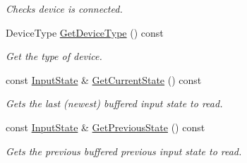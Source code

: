 \begin{DoxyCompactItemize}
\begin{DoxyCompactList}\small\item\em Checks device is connected. \end{DoxyCompactList}\item 
Device\+Type \hyperlink{class_blade_1_1_input_device_a4af210da6267e595e1239bab35f8e9e3}{Get\+Device\+Type} () const
\begin{DoxyCompactList}\small\item\em Get the type of device. \end{DoxyCompactList}\item 
const \hyperlink{struct_blade_1_1_input_state}{Input\+State} \& \hyperlink{class_blade_1_1_input_device_a71a14408ab206c4d983012b06b921d37}{Get\+Current\+State} () const
\begin{DoxyCompactList}\small\item\em Gets the last (newest) buffered input state to read. \end{DoxyCompactList}\item 
const \hyperlink{struct_blade_1_1_input_state}{Input\+State} \& \hyperlink{class_blade_1_1_input_device_a45c90dad5932209601cf8eeea85f4036}{Get\+Previous\+State} () const
\begin{DoxyCompactList}\small\item\em Gets the previous buffered previous input state to read. \end{DoxyCompactList}\end{DoxyCompactItemize}
